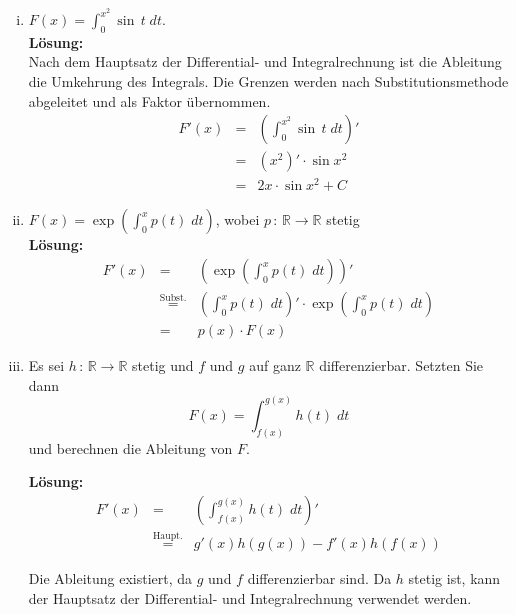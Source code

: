 \documentclass[11pt,a4paper,ngerman]{article}
\begin{document}
\begin{enumerate}[i)]
    \item $F(x) = \int_{0}^{x^2} \sin \, t \; dt$.\\

\textbf{Lösung:}\\

Nach dem Hauptsatz der Differential- und Integralrechnung ist die Ableitung die Umkehrung des Integrals. Die Grenzen werden nach Substitutionsmethode abgeleitet und als Faktor übernommen.
$$
\begin{array}{rcl}
F'(x)	&=& \left( \int_0^{x^2} \sin \, t \; dt\right)'\\
	&=& (x^2)' \cdot \sin x^2\\
	&=& 2x \cdot \sin x^2 + C
\end{array}
$$

    
    \item $F(x) = \exp \left( \int_{0}^{x} p(t)\; dt\right)$, wobei $p \, : \, \mathbb{R} \rightarrow \mathbb{R}$ stetig \\

\textbf{Lösung:}\\

$$
\begin{array}{rcl}
F'(x)	&=& \left( \exp \left( \int_0^x p(t) \; dt \right) \right)'\\
	&\stackrel{\text{Subst.}}{=}& \left( \int_0^x p(t) \; dt\right)' \cdot \exp \left( \int_0^x p(t) \; dt\right)\\
	&=& p(x) \cdot F(x)
\end{array}
$$

    \item Es sei $h \, : \, \mathbb{R} \rightarrow \mathbb{R}$ stetig und $f$ und $g$ auf ganz $\mathbb{R}$ differenzierbar. Setzten Sie dann
$$
    F(x) = \int_{f(x)}^{g(x)} h(t) \; dt
$$
und berechnen die Ableitung von $F$.\\

\pagebreak

\textbf{Lösung:}\\

$$
\begin{array}{rcl}
F'(x)	&=& \left( \int_{f(x)}^{g(x)} h(t) \; dt \right)'\\
	&\stackrel{\text{Haupt.}}{=}& g'(x) h(g(x)) - f'(x) h (f(x))
\end{array}
$$

Die Ableitung existiert, da $g$ und $f$ differenzierbar sind. Da $h$ stetig ist, kann der Hauptsatz der Differential- und Integralrechnung verwendet werden.

\end{enumerate}
\end{document}

